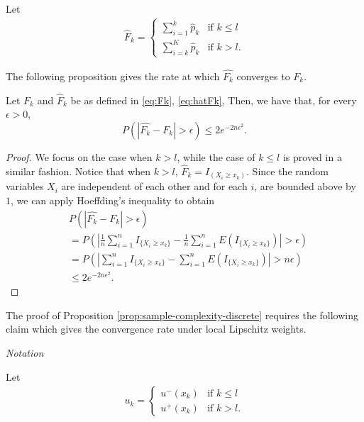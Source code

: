



Let
\begin{align}
\label{eq:hatFk}
\hat F_k = 
\begin{cases}
   \sum_{i=1}^k \hat p_k & \text{if   } k \leq l \\
   \sum_{i=k}^K \hat p_k & \text{if  }  k > l.
\end{cases}  
\end{align}

The following proposition gives the rate at which $\hat{F_k}$ converges to $F_k$.
\begin{proposition}
\label{prop:hoeffding-discrete}
Let $F_k$ and $\hat F_k$ be as defined in \eqref{eq:Fk}, \eqref{eq:hatFk}, Then, we have that, for every $\epsilon >0$, 
$$P(|\hat{F_k}-F_k| > \epsilon) \leq 2 e^{-2n \epsilon^2}.$$
\end{proposition}
\begin{proof}
We focus on the case when $k > l$, while the case of $k \leq l$ is proved in a similar fashion.
Notice that when $k>l$,  $\hat F_k =I_{(X_i \geq  x_k) }$. Since the random variables $X_i$ are independent of each other and  for each $i$, are bounded above by $1$, we can apply Hoeffding's inequality to obtain 
\begin{align*}
&
P(\left|\hat{F_k}- F_k \right| > \epsilon) \\ & = P(\left| \frac{1}{n} \sum_{i=1}^n I_{\{X_i \geq
x_k\}} - \frac{1}{n} \sum_{i=1}^n E(I_{\{X_i \geq x_k\}}) \right| > \epsilon) \\ & = P(\left|
\sum_{i=1}^n I_{\{X_i \geq x_k\}} - \sum_{i=1}^n E(I_{\{X_i \geq x_k\}}) \right| > n\epsilon) \\ &
    \leq 2e^{-2n \epsilon^2}.
\end{align*}
\end{proof}

The proof of Proposition \ref{prop:sample-complexity-discrete} requires the following claim which gives the convergence rate under local Lipschitz weights. 

\begin{remark}\textit{Notation}

Let 
\begin{align}
\label{eq:uplusminusxk}
u_k = 
\begin{cases}
   u^{-}(x_{k}) & \text{if   } k \leq l \\
   u^{+}(x_{k}) & \text{if  }  k > l.
\end{cases}  
\end{align}
\end{remark}


